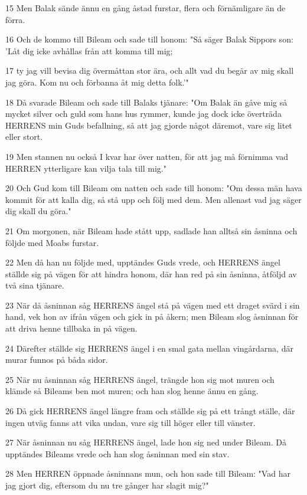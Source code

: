 \par 15 Men Balak sände ännu en gång åstad furstar, flera och förnämligare än de förra.
\par 16 Och de kommo till Bileam och sade till honom: "Så säger Balak Sippors son: 'Låt dig icke avhållas från att komma till mig;
\par 17 ty jag vill bevisa dig övermåttan stor ära, och allt vad du begär av mig skall jag göra. Kom nu och förbanna åt mig detta folk.'"
\par 18 Då svarade Bileam och sade till Balaks tjänare: "Om Balak än gåve mig så mycket silver och guld som hans hus rymmer, kunde jag dock icke överträda HERRENS min Guds befallning, så att jag gjorde något däremot, vare sig litet eller stort.
\par 19 Men stannen nu också I kvar har över natten, för att jag må förnimma vad HERREN ytterligare kan vilja tala till mig."
\par 20 Och Gud kom till Bileam om natten och sade till honom: "Om dessa män hava kommit för att kalla dig, så stå upp och följ med dem. Men allenast vad jag säger dig skall du göra."
\par 21 Om morgonen, när Bileam hade stått upp, sadlade han alltså sin åsninna och följde med Moabs furstar.
\par 22 Men då han nu följde med, upptändes Guds vrede, och HERRENS ängel ställde sig på vägen för att hindra honom, där han red på sin åsninna, åtföljd av två sina tjänare.
\par 23 När då åsninnan såg HERRENS ängel stå på vägen med ett draget svärd i sin hand, vek hon av ifrån vägen och gick in på åkern; men Bileam slog åsninnan för att driva henne tillbaka in på vägen.
\par 24 Därefter ställde sig HERRENS ängel i en smal gata mellan vingårdarna, där murar funnos på båda sidor.
\par 25 När nu åsninnan såg HERRENS ängel, trängde hon sig mot muren och klämde så Bileams ben mot muren; och han slog henne ännu en gång.
\par 26 Då gick HERRENS ängel längre fram och ställde sig på ett trångt ställe, där ingen utväg fanns att vika undan, vare sig till höger eller till vänster.
\par 27 När åsninnan nu såg HERRENS ängel, lade hon sig ned under Bileam. Då upptändes Bileams vrede och han slog åsninnan med sin stav.
\par 28 Men HERREN öppnade åsninnans mun, och hon sade till Bileam: "Vad har jag gjort dig, eftersom du nu tre gånger har slagit mig?"

